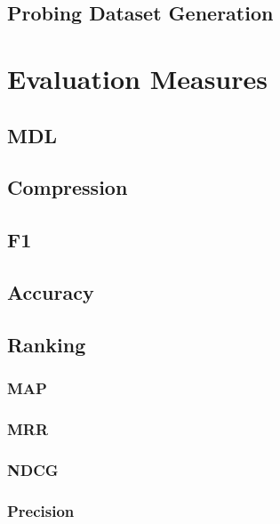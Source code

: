 \subsection{Probing Dataset Generation}

\section{Evaluation Measures}
\subsection{MDL}
\subsection{Compression}
\subsection{F1}
\subsection{Accuracy}
\subsection{Ranking}
\subsubsection{MAP}
\subsubsection{MRR}
\subsubsection{NDCG}
\subsubsection{Precision}

